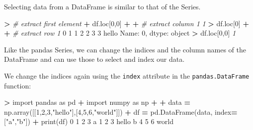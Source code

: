 \documentclass[
]{book}
\newenvironment{Shaded}{\begin{snugshade}}{\end{snugshade}}
\newcommand{\BuiltInTok}[1]{#1}
\newcommand{\CommentTok}[1]{\textcolor[rgb]{0.56,0.35,0.01}{\textit{#1}}}
\newcommand{\DecValTok}[1]{\textcolor[rgb]{0.00,0.00,0.81}{#1}}
\newcommand{\ImportTok}[1]{#1}
\newcommand{\NormalTok}[1]{#1}
\newcommand{\OperatorTok}[1]{\textcolor[rgb]{0.81,0.36,0.00}{\textbf{#1}}}
\newcommand{\StringTok}[1]{\textcolor[rgb]{0.31,0.60,0.02}{#1}}
\begin{document}
Selecting data from a DataFrame is similar to that of the Series.

\begin{Shaded}
\begin{Highlighting}[]
\OperatorTok{\textgreater{}} \CommentTok{\# extract first element }
\OperatorTok{+}\NormalTok{ df.loc[}\DecValTok{0}\NormalTok{,}\DecValTok{0}\NormalTok{]}
\OperatorTok{+} 
\OperatorTok{+} \CommentTok{\# extract column 1}
\CommentTok{\textquotesingle{}1\textquotesingle{}}
\OperatorTok{\textgreater{}}\NormalTok{ df.loc[}\DecValTok{0}\NormalTok{]}
\OperatorTok{+} 
\OperatorTok{+} \CommentTok{\# extract row 1}
\DecValTok{0}        \DecValTok{1}
\DecValTok{1}        \DecValTok{2}
\DecValTok{2}        \DecValTok{3}
\DecValTok{3}\NormalTok{    hello}
\NormalTok{Name: }\DecValTok{0}\NormalTok{, dtype: }\BuiltInTok{object}
\OperatorTok{\textgreater{}}\NormalTok{ df.loc[}\DecValTok{0}\NormalTok{,}\DecValTok{0}\NormalTok{]}
\CommentTok{\textquotesingle{}1\textquotesingle{}}
\end{Highlighting}
\end{Shaded}

Like the pandas Series, we can change the indices and the column names of the DataFrame and can use those to select and index our data.

We change the indices again using the \texttt{index} attribute in the \texttt{pandas.DataFrame} function:

\begin{Shaded}
\begin{Highlighting}[]
\OperatorTok{\textgreater{}} \ImportTok{import}\NormalTok{ pandas }\ImportTok{as}\NormalTok{ pd}
\OperatorTok{+} \ImportTok{import}\NormalTok{ numpy }\ImportTok{as}\NormalTok{ np}
\OperatorTok{+} 
\OperatorTok{+}\NormalTok{ data }\OperatorTok{=}\NormalTok{ np.array([[}\DecValTok{1}\NormalTok{,}\DecValTok{2}\NormalTok{,}\DecValTok{3}\NormalTok{,}\StringTok{"hello"}\NormalTok{],[}\DecValTok{4}\NormalTok{,}\DecValTok{5}\NormalTok{,}\DecValTok{6}\NormalTok{,}\StringTok{"world"}\NormalTok{]])}
\OperatorTok{+}\NormalTok{ df }\OperatorTok{=}\NormalTok{ pd.DataFrame(data, index}\OperatorTok{=}\NormalTok{[}\StringTok{"a"}\NormalTok{,}\StringTok{"b"}\NormalTok{])}
\OperatorTok{+} \BuiltInTok{print}\NormalTok{(df)}
   \DecValTok{0}  \DecValTok{1}  \DecValTok{2}      \DecValTok{3}
\NormalTok{a  }\DecValTok{1}  \DecValTok{2}  \DecValTok{3}\NormalTok{  hello}
\NormalTok{b  }\DecValTok{4}  \DecValTok{5}  \DecValTok{6}\NormalTok{  world}
\end{Highlighting}
\end{Shaded}
\end{document}

